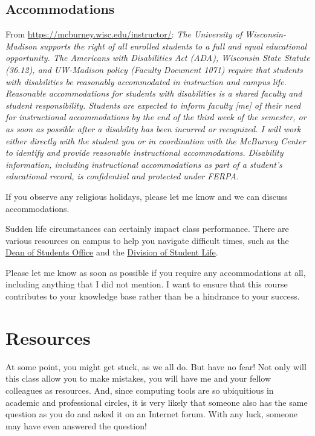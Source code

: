 \documentclass[11pt,]{article}
\begin{document}
\hypertarget{accommodations}{%
\subsection{Accommodations}\label{accommodations}}

From \url{https://mcburney.wisc.edu/instructor/}: \emph{The University
of Wisconsin-Madison supports the right of all enrolled students to a
full and equal educational opportunity. The Americans with Disabilities
Act (ADA), Wisconsin State Statute (36.12), and UW-Madison policy
(Faculty Document 1071) require that students with disabilities be
reasonably accommodated in instruction and campus life. Reasonable
accommodations for students with disabilities is a shared faculty and
student responsibility. Students are expected to inform faculty {[}me{]}
of their need for instructional accommodations by the end of the third
week of the semester, or as soon as possible after a disability has been
incurred or recognized. I will work either directly with the student you
or in coordination with the McBurney Center to identify and provide
reasonable instructional accommodations. Disability information,
including instructional accommodations as part of a student's
educational record, is confidential and protected under FERPA.}

If you observe any religious holidays, please let me know and we can
discuss accommodations.

Sudden life circumstances can certainly impact class performance. There
are various resources on campus to help you navigate difficult times,
such as the \href{https://doso.students.wisc.edu/}{Dean of Students
Office} and the \href{https://students.wisc.edu/}{Division of Student
Life}.

Please let me know as soon as possible if you require any accommodations
at all, including anything that I did not mention. I want to ensure that
this course contributes to your knowledge base rather than be a
hindrance to your success.

\hypertarget{resources}{%
\section{Resources}\label{resources}}

At some point, you might get stuck, as we all do. But have no fear! Not
only will this class allow you to make mistakes, you will have me and
your fellow colleagues as resources. And, since computing tools are so
ubiquitious in academic and professional circles, it is very likely that
someone also has the same question as you do and asked it on an Internet
forum. With any luck, someone may have even answered the question!
\end{document}
